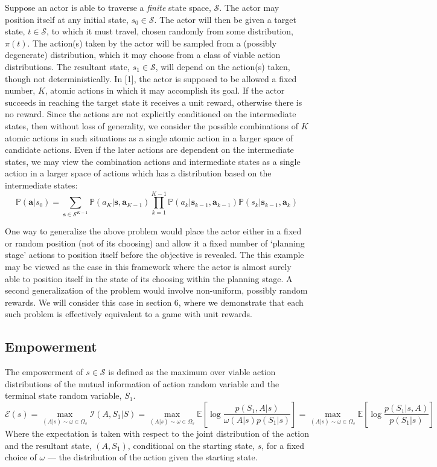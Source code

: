 \documentclass{article}
\newcommand{\EE}{\mathbb{E}}
\newcommand{\PP}{\mathbb{P}}
\newcommand{\Ss}{\mathcal{S}}
\newcommand{\Ii}{\mathcal{I}}
\newcommand{\Ee}{\mathcal{E}}
\begin{document}
Suppose an actor is able to traverse a \textit{finite} state space, $\Ss$. 
The actor may position itself at any initial state, $s_0\in \Ss$. 
The actor will then be given a target state, $t\in \Ss$, to which it must travel, chosen randomly from some distribution, $\pi(t)$. 
The action(s) taken by the actor will be sampled from a (possibly degenerate) distribution, which it may choose from a class of viable action distributions. 
The resultant state, $s_1\in\Ss$, will depend on the action(s) taken, though not deterministically.  
In [1], the actor is supposed to be allowed a fixed number, $K$, atomic actions in which it may accomplish its goal.
If the actor succeeds in reaching the target state it receives a unit reward, otherwise there is no reward.
Since the actions are not explicitly conditioned on the intermediate states, then without loss of generality, we consider the possible combinations of $K$ atomic actions in such situations as a single atomic action in a larger space of candidate actions.
Even if the later actions are dependent on the intermediate states, we may view the combination actions and intermediate states as a single action in a larger space of actions which has a distribution based on the intermediate states:
\[\PP(\mathbf{a}|s_0) = \sum_{\mathbf{s}\in \Ss^{K-1}} \PP(a_K|\mathbf{s},\mathbf{a}_{K-1}) \prod_{k=1}^{K-1} \PP(a_k|\mathbf{s}_{k-1},\mathbf{a}_{k-1})\PP(s_{k}|\mathbf{s}_{k-1},\mathbf{a}_k)\]

One way to generalize the above problem would place the actor either in a fixed or random position (not of its choosing) and allow it a fixed number of `planning stage' actions to position itself before the objective is revealed. 
The this example may be viewed as the case in this framework where the actor is almost surely able to position itself in the state of its choosing within the planning stage.
A second generalization of the problem would involve non-uniform, possibly random rewards. We will consider this case in section 6, where we demonstrate that each such problem is effectively equivalent to a game with unit rewards. 


\subsection{Empowerment}
The empowerment of $s\in\mathcal{S}$ is defined as the maximum over viable action distributions of the mutual information of action random variable and the terminal state random variable, $S_1$.
\[\Ee(s)=\max_{(A|s)\sim\omega\in\Omega_s}\Ii(A,S_1|S)=\max_{(A|s)\sim\omega\in\Omega_s}\EE\left[\log\frac{p(S_1,A|s)}{\omega(A|s)p(S_1|s)}\right]=\max_{(A|s)\sim\omega\in\Omega_s}\EE\left[\log\frac{p(S_1|s,A)}{p(S_1|s)}\right] \]
Where the expectation is taken with respect to the joint distribution of the action and the resultant state, $(A,S_1)$, conditional on the starting state, $s$, for a fixed choice of $\omega$ --- the distribution of the action given the starting state. 
\end{document}
